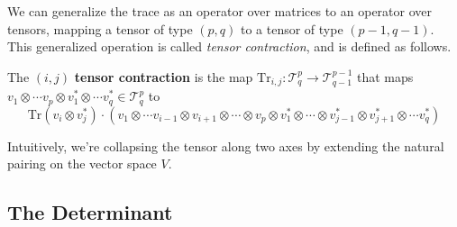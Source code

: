 \documentclass{article}
\newcommand{\n}{\leavevmode \newline}
\newcommand{\nn}{\leavevmode \newline \newline}
\begin{document}
\nn
We can generalize the trace as an operator over matrices to an operator over tensors, mapping a tensor of type $ (p, q) $ to a tensor of type $ (p - 1, q - 1) $. This generalized operation is called \textit{tensor contraction}, and is defined as follows.
\n
\begin{adjustwidth}{1cm}{1cm}
    The $ (i, j) $ \textbf{tensor contraction} is the map $ \text{Tr}_{i, j}: \mathcal{T}_q^p \rightarrow \mathcal{T}_{q - 1}^{p - 1} $ that maps $ v_1 \otimes \cdots v_p \otimes v_1^* \otimes \cdots v_q^* \in \mathcal{T}_q^p $ to
        $$ \text{Tr}(v_i \otimes v_j^*) \cdot (v_1 \otimes \cdots v_{i - 1} \otimes v_{i + 1} \otimes \cdots \otimes v_p \otimes v_1^* \otimes \cdots \otimes v_{j - 1}^* \otimes v_{j + 1}^* \otimes \cdots v_q^*) $$
\end{adjustwidth}
Intuitively, we're collapsing the tensor along two axes by extending the natural pairing on the vector space $ V $.

\subsection{The Determinant}
\end{document}
